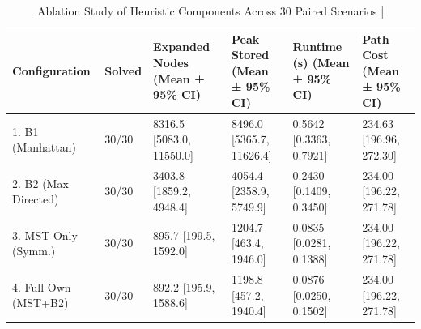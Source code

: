 \begin{table}[htbp]
\centering
\caption{Ablation Study of Heuristic Components Across 30 Paired Scenarios | \stampline}
\label{tab:ablation}
\begin{tabular}{llllll}
\toprule
Configuration & Solved & Expanded Nodes (Mean ± 95\% CI) & Peak Stored (Mean ± 95\% CI) & Runtime (s) (Mean ± 95\% CI) & Path Cost (Mean ± 95\% CI) \\
\midrule
1. B1 (Manhattan) & 30/30 & 8316.5 [5083.0, 11550.0] & 8496.0 [5365.7, 11626.4] & 0.5642 [0.3363, 0.7921] & 234.63 [196.96, 272.30] \\
2. B2 (Max Directed) & 30/30 & 3403.8 [1859.2, 4948.4] & 4054.4 [2358.9, 5749.9] & 0.2430 [0.1409, 0.3450] & 234.00 [196.22, 271.78] \\
3. MST-Only (Symm.) & 30/30 & 895.7 [199.5, 1592.0] & 1204.7 [463.4, 1946.0] & 0.0835 [0.0281, 0.1388] & 234.00 [196.22, 271.78] \\
4. Full Own (MST+B2) & 30/30 & 892.2 [195.9, 1588.6] & 1198.8 [457.2, 1940.4] & 0.0876 [0.0250, 0.1502] & 234.00 [196.22, 271.78] \\
\bottomrule
\end{tabular}

\end{table}
